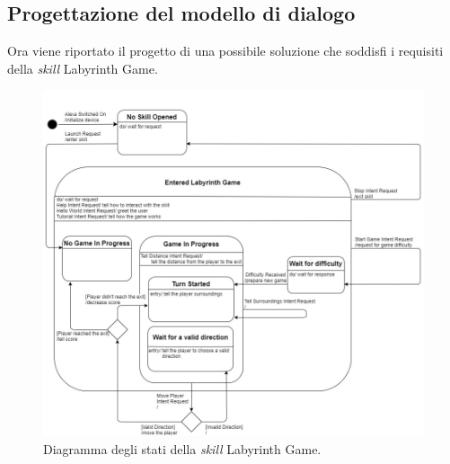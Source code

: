 \subsection{Progettazione del modello di dialogo}
\label{subsec:Sezione4.3.2}

Ora viene riportato il progetto di una possibile soluzione che soddisfi i
requisiti della \textit{skill} Labyrinth Game.

\begin{figure}[!ht]
  \centering
  \includegraphics[scale=0.48]{resources/images/design/skill-state-diagram/labyrinth-game-state-diagram.jpg}
  \caption{Diagramma degli stati della \textit{skill} Labyrinth Game.}
  \label{fig:figure4.8}
\end{figure}

